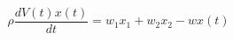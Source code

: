 \begin{equation}
  \rho \frac{dV(t)x(t)}{dt} = w_1 x_1 + w_2 x_2 - w x(t)
  \label{eq:massbalance02_1}
\end{equation}